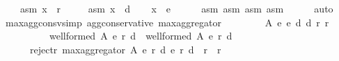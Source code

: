 \begin{isabellebody}
\ \ \ \ asm{}{\isacharcolon}{\kern0pt}\ {\isachardoublequoteopen}x\ {\isasymnotin}\ r{}{\isachardoublequoteclose}\ \isanewline
\ \ \ \ asm{}{\isacharcolon}{\kern0pt}\ {\isachardoublequoteopen}x\ {\isasymin}\ d{}{\isachardoublequoteclose}\isanewline
\ \ \isamarkupfalse%
\ {\isachardoublequoteopen}x\ {\isasymin}\ e{}{\isachardoublequoteclose}\isanewline
\ \ \ \ \isamarkupfalse%
\ asm{}\ asm{}\ asm{}\ asm{}\isanewline
\ \ \ \ \isamarkupfalse%
\ auto\isanewline
{}\isamarkupfalse%
%
\endisatagproof
{\isafoldproof}%
%
\isadelimproof
%
\endisadelimproof
%
\isadelimdocument
%
\endisadelimdocument
%
\isatagdocument
%
\isamarkuptrue%
%
\endisatagdocument
{\isafolddocument}%
%
\isadelimdocument
%
\endisadelimdocument
{}\isamarkupfalse%
\ max{\isacharunderscore}{\kern0pt}agg{\isacharunderscore}{\kern0pt}consv{\isacharbrackleft}{\kern0pt}simp{\isacharbrackright}{\kern0pt}{\isacharcolon}{\kern0pt}\ {\isachardoublequoteopen}agg{\isacharunderscore}{\kern0pt}conservative\ max{\isacharunderscore}{\kern0pt}aggregator{\isachardoublequoteclose}\isanewline
%
\isadelimproof
%
\endisadelimproof
%
\isatagproof
{}\isamarkupfalse%
\ {\isacharminus}{\kern0pt}\isanewline
\ \ \isamarkupfalse%
\isanewline
\ \ \ \ {\isachardoublequoteopen}{\isasymforall}A\ e{}\ e{}\ d{}\ d{}\ r{}\ r{}{\isachardot}{\kern0pt}\isanewline
\ \ \ \ \ \ \ \ \ \ {\isacharparenleft}{\kern0pt}well{\isacharunderscore}{\kern0pt}formed\ A\ {\isacharparenleft}{\kern0pt}e{}{\isacharcomma}{\kern0pt}\ r{}{\isacharcomma}{\kern0pt}\ d{}{\isacharparenright}{\kern0pt}\ {\isasymand}\ well{\isacharunderscore}{\kern0pt}formed\ A\ {\isacharparenleft}{\kern0pt}e{}{\isacharcomma}{\kern0pt}\ r{}{\isacharcomma}{\kern0pt}\ d{}{\isacharparenright}{\kern0pt}{\isacharparenright}{\kern0pt}\ {\isasymlongrightarrow}\isanewline
\ \ \ \ \ \ reject{\isacharunderscore}{\kern0pt}r\ {\isacharparenleft}{\kern0pt}max{\isacharunderscore}{\kern0pt}aggregator\ A\ {\isacharparenleft}{\kern0pt}e{}{\isacharcomma}{\kern0pt}\ r{}{\isacharcomma}{\kern0pt}\ d{}{\isacharparenright}{\kern0pt}\ {\isacharparenleft}{\kern0pt}e{}{\isacharcomma}{\kern0pt}\ r{}{\isacharcomma}{\kern0pt}\ d{}{\isacharparenright}{\kern0pt}{\isacharparenright}{\kern0pt}\ {\isacharequal}{\kern0pt}\ r{}\ {\isasyminter}\ r{}{\isachardoublequoteclose}\isanewline

\end{isabellebody}
